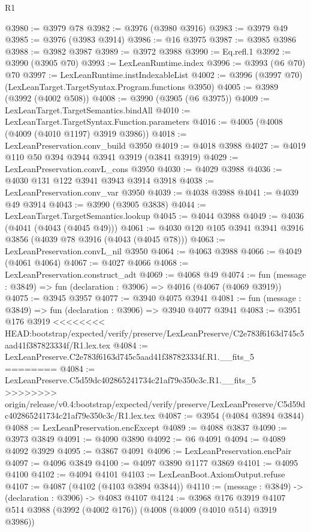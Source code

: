 \begin{lexlean}{R1}
\begin{coremodule}
{{{{{{{{{{{{{{{{{{{{{{{{{{{{{{{{{{{{{{{{{{{{{{{{{{{{{{{{{{{{{{{{{{{{{{{{{{{{{{{{{{{{{{{{{{{{{{{{{{{{{{{{{{{{{{{{{{{{{{{{{{{{{{{{{{{{{{{{{{{{{{{{{{{{{{{{{{{{{{{{{{{{{{{{{{{{{{{{{{{{{{{{{{@3980 := @3979 @78
@3982 := @3976 (@3980 @3916)
@3983 := @3979 @49
@3985 := @3976 (@3983 @3914)
@3986 := @16 @3975
@3987 := @3985 @3986
@3988 := @3982 @3987
@3989 := @3972 @3988
@3990 := Eq.refl.{1}
@3992 := @3990 (@3905 @70)
@3993 := LexLeanRuntime.index
@3996 := @3993 (@6 @70) @70
@3997 := LexLeanRuntime.instIndexableList
@4002 := @3996 (@3997 @70) (LexLeanTarget.TargetSyntax.Program.functions @3950)
@4005 := @3989 (@3992 (@4002 @508))
@4008 := @3990 (@3905 (@6 @3975))
@4009 := LexLeanTarget.TargetSemantics.bindAll
@4010 := LexLeanTarget.TargetSyntax.Function.parameters
@4016 := @4005 (@4008 (@4009 (@4010 @1197) @3919 @3986))
@4018 := LexLeanPreservation.conv_build @3950
@4019 := @4018 @3988
@4027 := @4019 @110 @50 @394 @3944 @3941 @3919 (@3841 @3919)
@4029 := LexLeanPreservation.convL_cons @3950
@4030 := @4029 @3988
@4036 := @4030 @131 @122 @3941 @3943 @3914 @3918
@4038 := LexLeanPreservation.conv_var @3950
@4039 := @4038 @3988
@4041 := @4039 @49 @3914
@4043 := @3990 (@3905 @3838)
@4044 := LexLeanTarget.TargetSemantics.lookup
@4045 := @4044 @3988
@4049 := @4036 (@4041 (@4043 (@4045 @49)))
@4061 := @4030 @120 @105 @3941 @3941 @3916 @3856 (@4039 @78 @3916 (@4043 (@4045 @78)))
@4063 := LexLeanPreservation.convL_nil @3950
@4064 := @4063 @3988
@4066 := @4049 (@4061 @4064)
@4067 := @4027 @4066
@4068 := LexLeanPreservation.construct_adt
@4069 := @4068 @49
@4074 := fun (message : @3849) => fun (declaration : @3906) => @4016 (@4067 (@4069 @3919))
@4075 := @3945 @3957
@4077 := @3940 @4075 @3941
@4081 := fun (message : @3849) => fun (declaration : @3906) => @3940 @4077 @3941
@4083 := @3951 @176 @3919
<<<<<<<< HEAD:bootstrap/expected/verify/preserve/LexLeanPreserve/C2e783f6163d745c5aad41f387823334f/R1.lex.tex
@4084 := LexLeanPreserve.C2e783f6163d745c5aad41f387823334f.R1.__fits_5
========
@4084 := LexLeanPreserve.C5d59dc402865241734c21af79e350c3c.R1.__fits_5
>>>>>>>> origin/release/v0.4:bootstrap/expected/verify/preserve/LexLeanPreserve/C5d59dc402865241734c21af79e350c3c/R1.lex.tex
@4087 := @3954 (@4084 @3894 @3844)
@4088 := LexLeanPreservation.encExcept
@4089 := @4088 @3837
@4090 := @3973 @3849
@4091 := @4090 @3890
@4092 := @6 @4091
@4094 := @4089 @4092 @3929
@4095 := @3867 @4091
@4096 := LexLeanPreservation.encPair
@4097 := @4096 @3849
@4100 := @4097 @3890 @1177 @3869
@4101 := @4095 @4100
@4102 := @4094 @4101
@4103 := LexLeanBoot.AxiomOutput.refuse
@4107 := @4087 (@4102 (@4103 @3894 @3844))
@4110 := (message : @3849) -> (declaration : @3906) -> @4083 @4107
@4124 := @3968
    @176
    @3919
    @4107
    @514
    @3988
    (@3992 (@4002 @176))
    (@4008 (@4009 (@4010 @514) @3919 @3986))
}}}}}}}}}}}}}}}}}}}}}}}}}}}}}}}}}}}}}}}}}}}}}}}}}}}}}}}}}}}}}}}}}}}}}}}}}}}}}}}}}}}}}}}}}}}}}}}}}}}}}}}}}}}}}}}}}}}}}}}}}}}}}}}}}}}}}}}}}}}}}}}}}}}}}}}}}}}}}}}}}}}}}}}}}}}}}}}}}}}}}}}}}}
\end{coremodule}
\end{lexlean}
